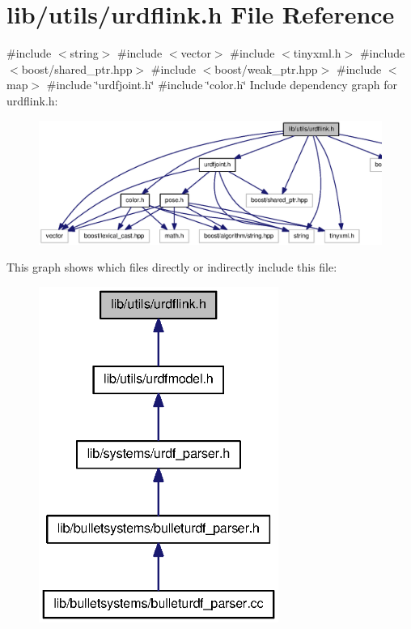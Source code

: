 \section{lib/utils/urdflink.h \-File \-Reference}
\label{urdflink_8h}
{\ttfamily \#include $<$string$>$}\*
{\ttfamily \#include $<$vector$>$}\*
{\ttfamily \#include $<$tinyxml.\-h$>$}\*
{\ttfamily \#include $<$boost/shared\-\_\-ptr.\-hpp$>$}\*
{\ttfamily \#include $<$boost/weak\-\_\-ptr.\-hpp$>$}\*
{\ttfamily \#include $<$map$>$}\*
{\ttfamily \#include \char`\"{}urdfjoint.\-h\char`\"{}}\*
{\ttfamily \#include \char`\"{}color.\-h\char`\"{}}\*
\-Include dependency graph for urdflink.\-h\-:
\nopagebreak
\begin{figure}[H]
\begin{center}
\leavevmode
\includegraphics[width=350pt]{urdflink_8h__incl}
\end{center}
\end{figure}
\-This graph shows which files directly or indirectly include this file\-:
\nopagebreak
\begin{figure}[H]
\begin{center}
\leavevmode
\includegraphics[width=222pt]{urdflink_8h__dep__incl}
\end{center}
\end{figure}
